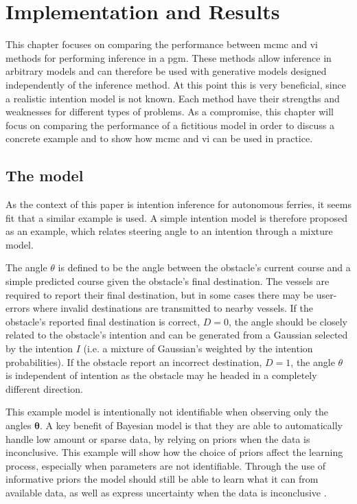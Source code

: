 \chapter{Implementation and Results}\label{chap:impl}

This chapter focuses on comparing the performance between \acrshort{mcmc} and \acrshort{vi} methods for performing inference in a \acrshort{pgm}. These methods allow inference in arbitrary models and can therefore be used with generative models designed independently of the inference method. At this point this is very beneficial, since a realistic intention model is not known. Each method have their strengths and weaknesses for different types of problems. As a compromise, this chapter will focus on comparing the performance of a fictitious model in order to discuss a concrete example and to show how \acrshort{mcmc} and \acrshort{vi} can be used in practice.

\section{The model}
As the context of this paper is intention inference for autonomous ferries, it seems fit that a similar example is used. A simple intention model is therefore proposed as an example, which relates steering angle to an intention through a mixture model. 

The angle $\theta$ is defined to be the angle between the obstacle's current course and a simple predicted course given the obstacle's final destination. The vessels are required to report their final destination, but in some cases there may be user-errors where invalid destinations are transmitted to nearby vessels. If the obstacle's reported final destination is correct, $D=0$, the angle should be closely related to the obstacle's intention and can be generated from a Gaussian selected by the intention $I$ (i.e. a mixture of Gaussian's weighted by the intention probabilities). If the obstacle report an incorrect destination, $D=1$, the angle $\theta$ is independent of intention as the obstacle may he headed in a completely different direction.

This example model is intentionally not identifiable when observing only the angles $\boldsymbol{\theta}$. A key benefit of Bayesian model is that they are able to automatically handle low amount or sparse data, by relying on priors when the data is inconclusive. This example will show how the choice of priors affect the learning process, especially when parameters are not identifiable. Through the use of informative priors the model should still be able to learn what it can from available data, as well as express uncertainty when the data is inconclusive .   

